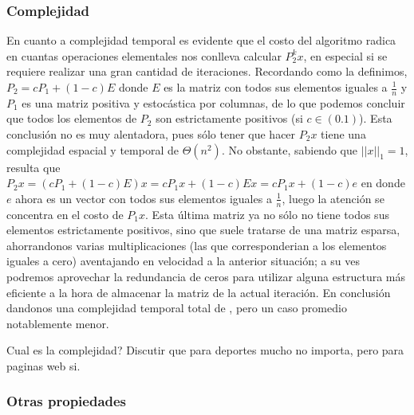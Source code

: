 \iffalse
La idea básicamente es generar la secuencia $x_k = Px_{k-1}$ y tomar $k\to\infty$. Se puede probar que para este caso no importa el valor inicial que asignemos a la secuencia $x_0$, el vector converge al autovector asociado al mayor autovalor de P. Se puede probar que todo autovalor $\lambda$ de $P$ satisface que $|\lambda| < 1$.

Otra propiedad interesante es que el método de la potencia va a converger de forma asintotica siguiendo $\norm{Px_k - q}_1 \approx |\lambda_2| \norm{x-q}_1$ donde $\lambda_2$ es el segundo autovalor mas grande de P. \textbf{Mauro revisa esto y fijate si sirve y se puede hacer algún criterio de parada copado.}
\fi

\subsubsection{Complejidad}

En cuanto a complejidad temporal es evidente que el costo del algoritmo radica en cuantas operaciones elementales nos conlleva calcular $P_2^kx$, en especial si se requiere realizar una gran cantidad de iteraciones. Recordando como la definimos, $P_2 = cP_1 + (1-c)E$ donde $E$ es la matriz con todos sus elementos iguales a $\frac{1}{n}$ y $P_1$ es una matriz positiva y estocástica por columnas, de lo que podemos concluir que todos los elementos de $P_2$ son estrictamente positivos (si $c\in(0.1)$). Esta conclusión no es muy alentadora, pues sólo tener que hacer $P_2x$ tiene una complejidad espacial y temporal de $\Theta(n^2)$. No obstante, sabiendo que $||x||_1=1$, resulta que $P_2x = (cP_1 + (1-c)E)x = cP_1x + (1-c)Ex = cP_1x + (1-c)e$ en donde $e$ ahora es un vector con todos sus elementos iguales a $\frac{1}{n}$, luego la atención se concentra en el costo de $P_1x$. Esta última matriz ya no sólo no tiene todos sus elementos estrictamente positivos, sino que suele tratarse de una matriz esparsa, ahorrandonos varias multiplicaciones (las que corresponderian a los elementos iguales a cero) aventajando en velocidad a la anterior situación; a su ves podremos aprovechar la redundancia de ceros para utilizar alguna estructura más eficiente a la hora de almacenar la matriz de la actual iteración. En conclusión dandonos una complejidad temporal total de , pero un caso promedio notablemente menor.

\iffalse
Cual es la complejidad? Discutir que para deportes mucho no importa, pero para paginas web si.

\subsubsection{Otras propiedades}

